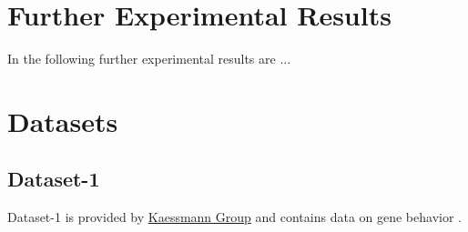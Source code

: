 \documentclass[11pt,titlepage,oneside,openany]{book}
\begin{document}
\chapter{Further Experimental Results}
\label{cha:appendix-b}

In the following further experimental results are ...

\chapter{Datasets}
\label{cha:Datasets}

\section{Dataset-1}
\label{dataset1}
Dataset-1 is provided by \href{https://www.zmbh.uni-heidelberg.de/kaessmann/}{Kaessmann Group} and contains data on gene behavior \cite{CardosoMoreira2019GeneEA}.
\end{document}
